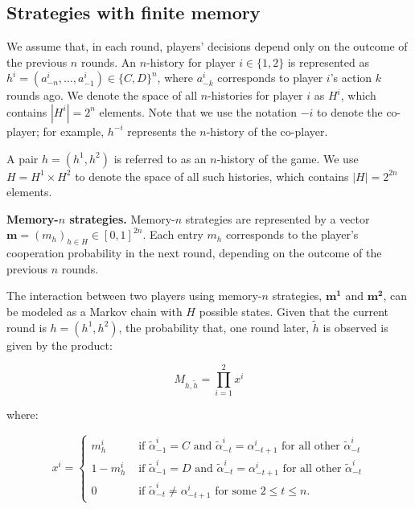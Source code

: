 \documentclass[11pt]{article}
\theoremstyle{definition}
\begin{document}
\subsection{Strategies with finite memory} 

We assume that, in each round, players' decisions depend only on the outcome of
the previous \(n\) rounds. An \(n\)-history for player \(i \in \{1, 2\}\) is
represented as \(h^i = (a^i_{-n}, \ldots, a^i_{-1}) \in \{C, D\}^n\), where
\(a^i_{-k}\) corresponds to player \(i\)'s action \(k\) rounds ago. We denote
the space of all \(n\)-histories for player \(i\) as \(H^i\), which contains
\(|H^i| = 2^n\) elements. Note that we use the notation \(-i\) to denote the
co-player; for example, \(h^{-i}\) represents the \(n\)-history of the
co-player.

A pair \(h = (h^1, h^2)\) is referred to as an \(n\)-history of the game. We use
\(H = H^1 \times H^2\) to denote the space of all such histories, which contains
\(|H| = 2^{2n}\) elements.


{\bf Memory-\(n\) strategies.} Memory-\(n\) strategies are represented by a
vector \(\mathbf{m} = (m_h)_{h\in H} \in [0,1]^{2n}\). Each entry \(m_h\)
corresponds to the player's cooperation probability in the next round, depending
on the outcome of the previous \(n\) rounds.

The interaction between two players using memory-\(n\) strategies,
\(\mathbf{m^{1}}\) and \(\mathbf{m^{2}}\), can be modeled as a Markov chain with
\(H\) possible states. Given that the current round is \(h = (h^{1}, h^{2})\),
the probability that, one round later, \(\tilde{h}\) is observed is given by the
product:

\begin{equation}\label{Eq:TransitionMatrix}
M_{h, \tilde{h}} = \prod_{i=1}^{2} x^{i}
\end{equation}

where:

\[
x^i = 
\begin{cases}
  m^{i}_{h} & \text{ if } \tilde{\alpha}^i_{-1} = C \text{ and } \tilde{\alpha}^i_{-t} = \alpha^i_{-t + 1} \text{ for all other } \tilde{\alpha}^i_{-t}\\
  1 - m^{i}_{h} & \text{ if } \tilde{\alpha}^i_{-1} = D \text{ and } \tilde{\alpha}^i_{-t} = \alpha^i_{-t + 1} \text{ for all other } \tilde{\alpha}^i_{-t}\\
  0 & \text{ if } \tilde{\alpha}^i_{-t} \neq  \alpha^i_{-t + 1} \text{ for some } 2 \leq t \leq n.
\end{cases}
\]
\end{document}
